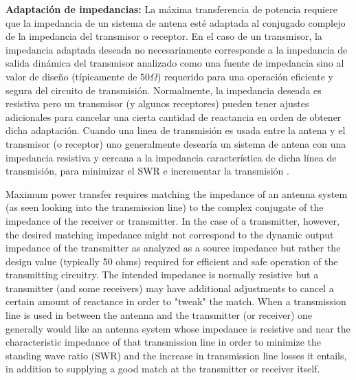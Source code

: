 
{\textbf{Adaptación de impedancias:}} La máxima transferencia de potencia requiere que la impedancia de un sistema de 
antena esté adaptada al conjugado complejo de la impedancia del transmisor o receptor. En el caso de un transmisor, 
la impedancia adaptada deseada no necesariamente corresponde a la impedancia de salida dinámica del transmisor analizado
como una fuente de impedancia sino al valor de diseño (típicamente de $50 \Omega$) requerido para una operación eficiente
y segura del circuito de transmisión. Normalmente, la impedancia deseada es resistiva pero un transmisor (y algunos receptores)
pueden tener ajustes adicionales para cancelar una cierta cantidad de reactancia en orden de obtener dicha adaptación. Cuando
una linea de transmisión es usada entre la antena y el transmisor (o receptor) uno generalmente desearía un sistema de antena
con una impedancia resistiva y cercana a la impedancia característica de dicha línea de transmisión, para minimizar el SWR 
e incrementar la transmisión \cite{AntennaWiki}. 


Maximum power transfer requires matching the impedance of an antenna system (as seen looking into the transmission line) to the complex conjugate of the impedance of the receiver or transmitter. In the case of a transmitter, however, the desired matching impedance might not correspond to the dynamic output impedance of the transmitter as analyzed as a source impedance but rather the design value (typically 50 ohms) required for efficient and safe operation of the transmitting circuitry. The intended impedance is normally resistive but a transmitter (and some receivers) may have additional adjustments to cancel a certain amount of reactance in order to "tweak" the match. When a transmission line is used in between the antenna and the transmitter (or receiver) one generally would like an antenna system whose impedance is resistive and near the characteristic impedance of that transmission line in order to minimize the standing wave ratio (SWR) and the increase in transmission line losses it entails, in addition to supplying a good match at the transmitter or receiver itself.



